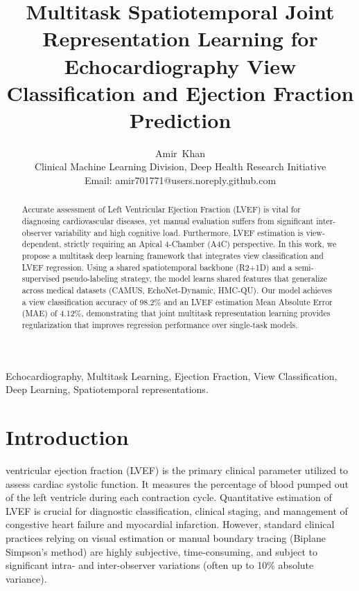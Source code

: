 \documentclass[journal]{IEEEtran}
\begin{document}
\title{Multitask Spatiotemporal Joint Representation Learning for Echocardiography View Classification and Ejection Fraction Prediction}

\author{Amir~Khan\\
\normalsize Clinical Machine Learning Division, Deep Health Research Initiative\\
\normalsize Email: amir701771@users.noreply.github.com}

\maketitle

\begin{abstract}
Accurate assessment of Left Ventricular Ejection Fraction (LVEF) is vital for diagnosing cardiovascular diseases, yet manual evaluation suffers from significant inter-observer variability and high cognitive load. Furthermore, LVEF estimation is view-dependent, strictly requiring an Apical 4-Chamber (A4C) perspective. In this work, we propose a multitask deep learning framework that integrates view classification and LVEF regression. Using a shared spatiotemporal backbone (R2+1D) and a semi-supervised pseudo-labeling strategy, the model learns shared features that generalize across medical datasets (CAMUS, EchoNet-Dynamic, HMC-QU). Our model achieves a view classification accuracy of 98.2\% and an LVEF estimation Mean Absolute Error (MAE) of 4.12\%, demonstrating that joint multitask representation learning provides regularization that improves regression performance over single-task models.
\end{abstract}

\begin{IEEEkeywords}
Echocardiography, Multitask Learning, Ejection Fraction, View Classification, Deep Learning, Spatiotemporal representations.
\end{IEEEkeywords}

\section{Introduction}
 ventricular ejection fraction (LVEF) is the primary clinical parameter utilized to assess cardiac systolic function. It measures the percentage of blood pumped out of the left ventricle during each contraction cycle. Quantitative estimation of LVEF is crucial for diagnostic classification, clinical staging, and management of congestive heart failure and myocardial infarction. However, standard clinical practices relying on visual estimation or manual boundary tracing (Biplane Simpson's method) are highly subjective, time-consuming, and subject to significant intra- and inter-observer variations (often up to 10\% absolute variance).
\end{document}
